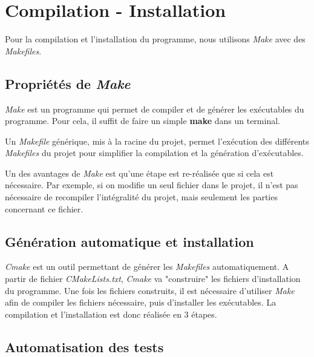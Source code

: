\chapter{Compilation - Installation}

Pour la compilation et l'installation du programme, nous utilisons \textit{Make} avec des \textit{Makefiles}.

\section{Propriétés de \textit{Make}}

\textit{Make} est un programme qui permet de compiler et de générer les exécutables du programme. Pour cela, il suffit de faire un simple \textbf{make} dans un terminal.

Un \textit{Makefile} générique, mis à la racine du projet, permet l'exécution des différents \textit{Makefiles} du projet pour simplifier la compilation et la génération d'exécutables.

Un des avantages de \textit{Make} est qu'une étape est re-réalisée que si cela est nécessaire. Par exemple, si on modifie un seul fichier dans le projet, il n'est pas nécessaire de recompiler l'intégralité du projet, mais seulement les parties concernant ce fichier.

\section{Génération automatique et installation}

\textit{Cmake} est un outil permettant de générer les \textit{Makefiles} automatiquement. A partir de fichier \textit{CMakeLists.txt}, \textit{Cmake} va "construire" les fichiers d'installation du programme.
Une fois les fichiers construits, il est nécessaire d'utiliser \textit{Make} afin de compiler les fichiers nécessaire, puis d'installer les exécutables. 
La compilation et l'installation est donc réalisée en 3 étapes.

\section{Automatisation des tests}

